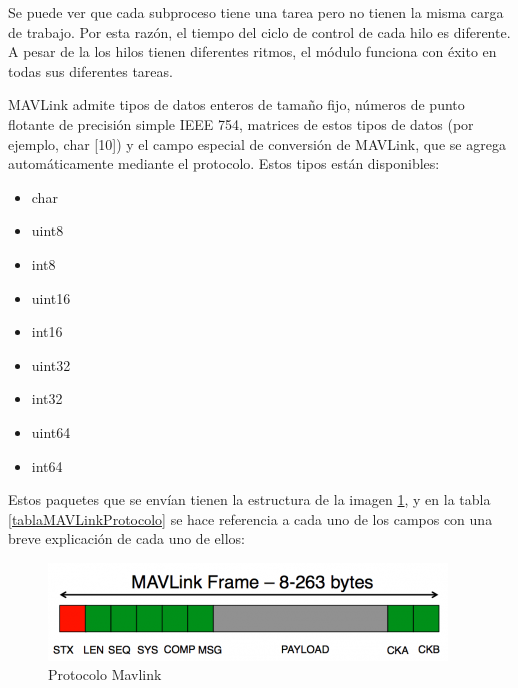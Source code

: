 Se puede ver que cada subproceso tiene una tarea pero no tienen la misma carga de trabajo.
Por esta razón, el tiempo del ciclo de control de cada hilo es diferente. A pesar de la los hilos tienen diferentes ritmos, el módulo funciona con éxito en todas sus diferentes tareas.

MAVLink admite tipos de datos enteros de tamaño fijo, números de punto flotante de precisión simple IEEE 754, matrices de estos tipos de datos (por ejemplo, char [10]) y el campo especial de conversión de MAVLink, que se agrega automáticamente mediante el protocolo. Estos tipos están disponibles:

\begin{multicols}{3}
\begin{itemize}
\item char
\item uint8
\item int8
\item uint16
\item int16
\item uint32
\item int32
\item uint64
\item int64
\end{itemize}
\end{multicols}

Estos paquetes que se envían tienen la estructura de la imagen \ref{fig:protocoloMavlink}, y en la tabla \ref{tablaMAVLinkProtocolo} se hace referencia a cada uno de los campos con una breve explicación de cada uno de ellos:

\clearpage
\begin{figure}[H]
  \centering
  \includegraphics[scale=0.65]{imagenes/protocoloMavLink.png}
  \caption{Protocolo Mavlink}
  \label{fig:protocoloMavlink}
\end{figure}

